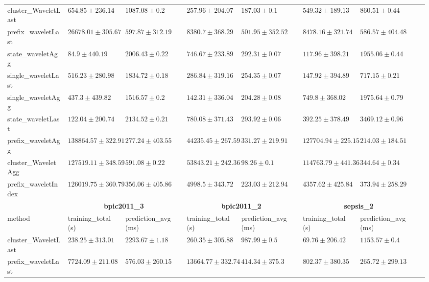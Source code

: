\documentclass[twoside,11pt]{Latex/Classes/PhDthesisPSnPDF}
\begin{document}
\begin{table}[h]
{\begin{tabular}{llllllll}
	cluster\_WaveletLast & $654.85 \pm 236.14$ & $1087.08 \pm 0.2$ & $257.96 \pm 204.07$ & $187.03 \pm 0.1$ & $549.32 \pm 189.13$ & $860.51 \pm 0.44$ \\ 
	prefix\_waveletLast & $26678.01 \pm 305.67$ & $597.87 \pm 312.19$ & $8380.7 \pm 368.29$ & $501.95 \pm 352.52$ & $8478.16 \pm 321.74$ & $586.57 \pm 404.48$ \\ 
	state\_waveletAgg & $\mathbf{84.9 \pm 440.19}$ & $2006.43 \pm 0.22$ & $746.67 \pm 233.89$ & $292.31 \pm 0.07$ & $\mathbf{117.96 \pm 398.21}$ & $1955.06 \pm 0.44$ \\ 
	single\_waveletLast & $516.23 \pm 280.98$ & $1834.72 \pm 0.18$ & $286.84 \pm 319.16$ & $254.35 \pm 0.07$ & $147.92 \pm 394.89$ & $717.15 \pm 0.21$ \\ 
	single\_waveletAgg & $437.3 \pm 439.82$ & $1516.57 \pm 0.2$ & $\mathbf{142.31 \pm 336.04}$ & $204.28 \pm 0.08$ & $749.8 \pm 368.02$ & $1975.64 \pm 0.79$ \\ 
	state\_waveletLast & $122.04 \pm 200.74$ & $2134.52 \pm 0.21$ & $780.08 \pm 371.43$ & $293.92 \pm 0.06$ & $392.25 \pm 378.49$ & $3469.12 \pm 0.96$ \\ 
	prefix\_waveletAgg & $138864.57 \pm 322.91$ & $\mathbf{277.24 \pm 403.55}$ & $44235.45 \pm 267.59$ & $331.27 \pm 219.91$ & $127704.94 \pm 225.15$ & $\mathbf{214.03 \pm 184.51}$ \\ 
	cluster\_WaveletAgg & $127519.11 \pm 348.59$ & $591.08 \pm 0.22$ & $53843.21 \pm 242.36$ & $\mathbf{98.26 \pm 0.1}$ & $114763.79 \pm 441.36$ & $344.64 \pm 0.34$ \\ 
	prefix\_waveletIndex & $126019.75 \pm 360.79$ & $356.06 \pm 405.86$ & $4998.5 \pm 343.72$ & $223.03 \pm 212.94$ & $4357.62 \pm 425.84$ & $373.94 \pm 258.29$ \\ 
	\bottomrule
	\toprule
	& \multicolumn{2}{c}{{\bfseries bpic2011\_3}} & \multicolumn{2}{c}{{\bfseries bpic2011\_2}} & \multicolumn{2}{c}{{\bfseries sepsis\_2}} \\ \cmidrule(lr){2-3} \cmidrule(lr){4-5} \cmidrule(lr){6-7}
	method  & training\_total (s) & prediction\_avg (ms) & training\_total (s) & prediction\_avg (ms) & training\_total (s) & prediction\_avg (ms) \\ \midrule
	cluster\_WaveletLast & $238.25 \pm 313.01$ & $2293.67 \pm 1.18$ & $260.35 \pm 305.88$ & $987.99 \pm 0.5$ & $69.76 \pm 206.42$ & $1153.57 \pm 0.4$ \\ 
	prefix\_waveletLast & $7724.09 \pm 211.08$ & $576.03 \pm 260.15$ & $13664.77 \pm 332.74$ & $414.34 \pm 375.3$ & $802.37 \pm 380.35$ & $\mathbf{265.72 \pm 299.13}$ \\ 

\end{tabular}}
\end{table}
\end{document}
